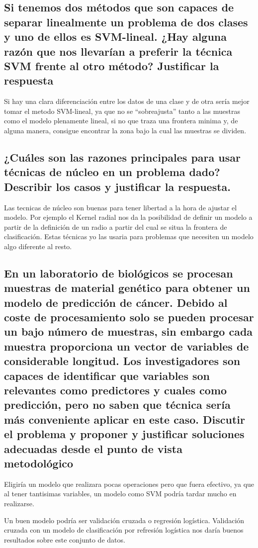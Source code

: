 \subsection{Si tenemos dos métodos que son capaces de separar linealmente un problema de dos clases y uno de ellos es SVM-lineal. ¿Hay alguna razón que nos llevarían a preferir la técnica SVM frente al otro método? Justificar la respuesta}

Si hay una clara diferenciación entre los datos de una clase y de otra sería mejor tomar el metodo SVM-lineal, ya que no se ``sobreajusta'' tanto a las muestras como el modelo plenamente lineal, si no que traza una frontera minima y, de alguna manera, consigue encontrar la zona bajo la cual las muestras se dividen.

\subsection{¿Cuáles son las razones principales para usar técnicas de núcleo en un problema dado? Describir los casos y justificar la respuesta.}

Las tecnicas de núcleo son buenas para tener libertad a la hora de ajustar el modelo. Por ejemplo el Kernel radial nos da la posibilidad de definir un modelo a partir de la definición de un radio a partir del cual se situa la frontera de clasificación. Estas técnicas yo las usaria para problemas que necesiten un modelo algo diferente al resto.

\subsection{En un laboratorio de biológicos se procesan muestras de material genético para obtener un  modelo de predicción de cáncer. Debido al coste de procesamiento solo se pueden procesar un bajo número de muestras, sin embargo cada muestra proporciona un vector de variables de considerable longitud. Los investigadores son capaces de identificar que variables son relevantes  como predictores y cuales como predicción, pero no saben que técnica sería más conveniente aplicar en este caso. Discutir el problema y proponer y justificar soluciones adecuadas desde el punto de vista metodológico}

Eligiría un modelo que realizara pocas operaciones pero que fuera efectivo, ya que al tener tantisimas variables, un modelo como SVM podría tardar mucho en realizarse.

Un buen modelo podría ser validación cruzada o regresión logística. Validación cruzada con un modelo de clasificación por refresión logística nos daría buenos resultados sobre este conjunto de datos.


